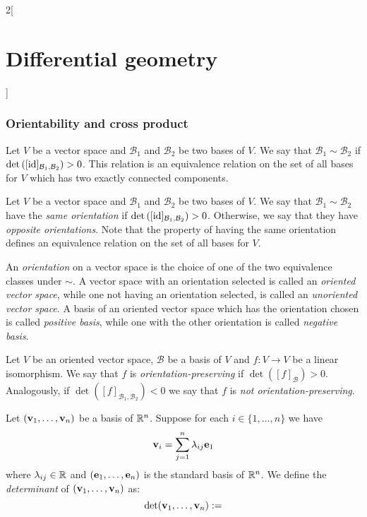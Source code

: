 \documentclass[../../../main.tex]{subfiles}
\begin{document}
\begin{multicols}{2}[\section{Differential geometry}]
  \subsubsection{Orientability and cross product}
  \begin{definition}
    Let $V$ be a vector space and $\mathcal{B}_1$ and $\mathcal{B}_2$ be two bases of $V$. We say that $\mathcal{B}_1\sim\mathcal{B}_2$ if $\det\left([\mathrm{id}]_{\mathcal{B}_1,\mathcal{B}_2}\right)>0$. This relation is an equivalence relation on the set of all bases for $V$ which has two exactly connected components.
  \end{definition}
  \begin{definition}
    Let $V$ be a vector space and $\mathcal{B}_1$ and $\mathcal{B}_2$ be two bases of $V$. We say that $\mathcal{B}_1\sim\mathcal{B}_2$ have the \emph{same orientation} if $\det\left([\mathrm{id}]_{\mathcal{B}_1,\mathcal{B}_2}\right)>0$. Otherwise, we say that they have \emph{opposite orientations}. Note that the property of having the same orientation defines an equivalence relation on the set of all bases for $V$.
  \end{definition}
  \begin{definition}
    An \emph{orientation} on a vector space is the choice of one of the two equivalence classes under $\sim$. A vector space with an orientation selected is called an \emph{oriented vector space}, while one not having an orientation selected, is called an \emph{unoriented vector space}. A basis of an oriented vector space which has the orientation chosen is called \emph{positive basis}, while one with the other orientation is called \emph{negative basis}.
  \end{definition}
  \begin{definition}
    Let $V$ be an oriented vector space, $\mathcal{B}$ be a basis of $V$ and $f:V\rightarrow V$ be a linear isomorphism. We say that $f$ is \emph{orientation-preserving} if $\det \left([f]_{\mathcal{B}}\right)>0$. Analogously, if $\det \left([f]_{\mathcal{B}_1,\mathcal{B}_2}\right)<0$ we say that $f$ is \emph{not orientation-preserving}.
  \end{definition}
  \begin{definition}
    Let $(\boldsymbol{\mathrm{v}}_1,\ldots,\boldsymbol{\mathrm{v}}_n)$ be a basis of $\mathbb{R}^n$. Suppose for each $i\in\{1,\ldots,n\}$ we have $$\boldsymbol{\mathrm{v}}_i=\sum_{j=1}^n\lambda_{ij}\boldsymbol{\mathrm{e}}_1$$ where $\lambda_{ij}\in\mathbb{R}$ and $(\boldsymbol{\mathrm{e}}_1,\ldots,\boldsymbol{\mathrm{e}}_n)$ is the standard basis of $\mathbb{R}^n$. We define the \emph{determinant} of $(\boldsymbol{\mathrm{v}}_1,\ldots,\boldsymbol{\mathrm{v}}_n)$ as: $$\det(\boldsymbol{\mathrm{v}}_1,\ldots,\boldsymbol{\mathrm{v}}_n):=
$$
\end{definition}
\end{multicols}
\end{document}
